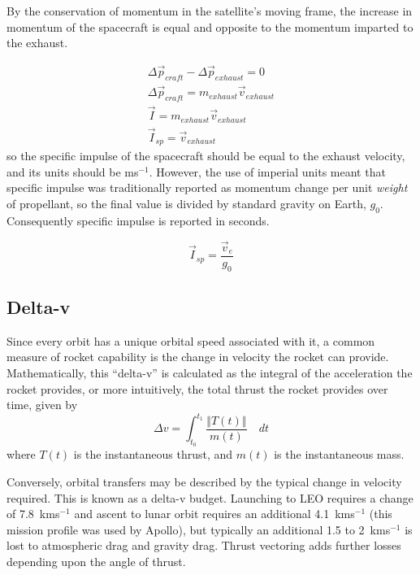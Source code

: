 By the conservation of momentum in the satellite's moving frame, the increase in momentum of the spacecraft is equal and opposite to the momentum imparted to the exhaust.

\begin{gather}
\Delta\vec{p}_{craft} - \Delta\vec{p}_{exhaust} = 0 \\
\Delta\vec{p}_{craft} = m_{exhaust}\vec{v}_{exhaust} \\
\vec{I} = m_{exhaust}\vec{v}_{exhaust} \\
\vec{I}_{sp} = \vec{v}_{exhaust}
\end{gather}
so the specific impulse of the spacecraft should be equal to the exhaust velocity, and its units should be ms$^{-1}$. However, the use of imperial units meant that specific impulse was traditionally reported as momentum change per unit {\em weight} of propellant, so the final value is divided by standard gravity on Earth, $g_0$. Consequently specific impulse is reported in seconds.

\begin{equation}
\vec{I}_{sp}=\frac{\vec{v}_e}{g_0}
\end{equation}

\subsection{Delta-v} \label{sub:Delta-v}

Since every orbit has a unique orbital speed associated with it, a common measure of rocket capability is the change in velocity the rocket can provide. Mathematically, this \enquote{delta-v} is calculated as the integral of the acceleration the rocket provides, or more intuitively, the total thrust the rocket provides over time, given by
\begin{equation}
\Delta v=\int_{t_{0}}^{t_{1}}\frac{\left\Vert T\left(t\right)\right\Vert }{m\left(t\right)}\quad dt\label{eq:Delta-V}
\end{equation}
where $T\left(t\right)$ is the instantaneous thrust, and $m\left(t\right)$ is the instantaneous mass.

Conversely, orbital transfers may be described by the typical change in velocity required. This is known as a delta-v budget. Launching to LEO requires a change of 7.8~kms$^{-1}$ and ascent to lunar orbit requires an additional 4.1~kms$^{-1}$ (this mission profile was used by Apollo), but typically an additional 1.5 to 2~kms$^{-1}$ is lost to atmospheric drag and gravity drag. Thrust vectoring adds further losses depending upon the angle of thrust. 

